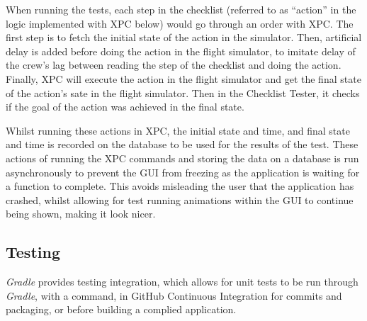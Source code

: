 \documentclass[../dissertation.tex]{subfiles}
\begin{document}
When running the tests, each step in the checklist (referred to as \enquote{action} in 
the logic implemented with XPC below) would go through an order with XPC.
The first step is to fetch the initial state of the action in the simulator.
Then, artificial delay is added before doing the
action in the flight simulator, to imitate delay of the crew's lag between reading the step of
the checklist and doing the action. Finally, XPC will execute the action in the flight simulator
and get the final state of the action's sate in the flight simulator.
Then in the Checklist Tester, it checks if the goal of the action was achieved in the final
state.

Whilst running these actions in XPC, the initial state and time, and final state and time
is recorded on the database to be used for the results of the test. These actions of
running the XPC commands and storing the data on a database is run asynchronously to prevent
the GUI from freezing as the application is waiting for a function to complete. This avoids
misleading the user that the application has crashed, whilst allowing for test running animations
within the GUI to continue being shown, making it look nicer.


\subsection{Testing}
\textit{Gradle} provides testing integration, which allows for unit tests to
be run through \textit{Gradle}, with a command, in GitHub Continuous Integration for
commits and packaging, or before building a complied application.
\end{document}
